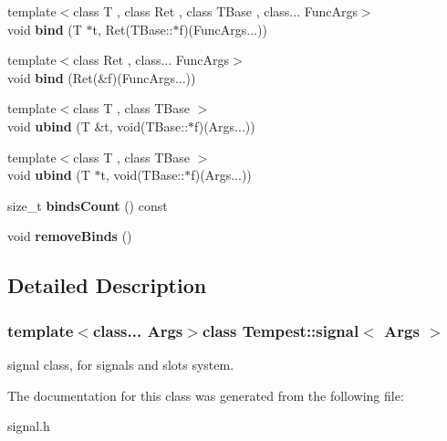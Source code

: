 \begin{DoxyCompactItemize}
\item 
\hypertarget{class_tempest_1_1signal_a23a61603819af374b92e75d637d1c988}{{\footnotesize template$<$class T , class Ret , class T\+Base , class... Func\+Args$>$ }\\void {\bfseries bind} (T $\ast$t, Ret(T\+Base\+::$\ast$f)(Func\+Args...))}\label{class_tempest_1_1signal_a23a61603819af374b92e75d637d1c988}

\item 
\hypertarget{class_tempest_1_1signal_a2570762c3381460178e963a1867d2310}{{\footnotesize template$<$class Ret , class... Func\+Args$>$ }\\void {\bfseries bind} (Ret(\&f)(Func\+Args...))}\label{class_tempest_1_1signal_a2570762c3381460178e963a1867d2310}

\item 
\hypertarget{class_tempest_1_1signal_ae403c55b03e005bd13ac987d1d99a94b}{{\footnotesize template$<$class T , class T\+Base $>$ }\\void {\bfseries ubind} (T \&t, void(T\+Base\+::$\ast$f)(Args...))}\label{class_tempest_1_1signal_ae403c55b03e005bd13ac987d1d99a94b}

\item 
\hypertarget{class_tempest_1_1signal_afe68843f9b978f72056a7a681da068de}{{\footnotesize template$<$class T , class T\+Base $>$ }\\void {\bfseries ubind} (T $\ast$t, void(T\+Base\+::$\ast$f)(Args...))}\label{class_tempest_1_1signal_afe68843f9b978f72056a7a681da068de}

\item 
\hypertarget{class_tempest_1_1signal_a37d88bf1a0679a8b98a4c9a0298484b5}{size\+\_\+t {\bfseries binds\+Count} () const }\label{class_tempest_1_1signal_a37d88bf1a0679a8b98a4c9a0298484b5}

\item 
\hypertarget{class_tempest_1_1signal_a01a25f6ad6ab26df7f41a47e71f0423a}{void {\bfseries remove\+Binds} ()}\label{class_tempest_1_1signal_a01a25f6ad6ab26df7f41a47e71f0423a}

\end{DoxyCompactItemize}


\subsection{Detailed Description}
\subsubsection*{template$<$class... Args$>$class Tempest\+::signal$<$ Args $>$}

signal class, for signals and slots system. 

The documentation for this class was generated from the following file\+:\begin{DoxyCompactItemize}
\item 
signal.\+h\end{DoxyCompactItemize}
